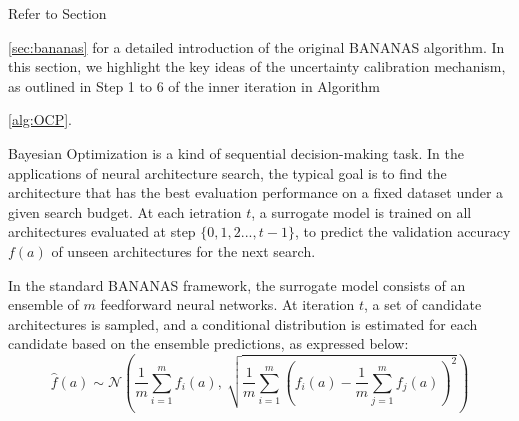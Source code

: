 \documentclass[a4paper,oneside,bibliography=totoc]{scrbook}
\begin{document}
Refer to Section {\ref{sec:bananas} for a detailed introduction of the original BANANAS algorithm. In this section, we highlight the key ideas of the uncertainty calibration mechanism, as outlined in Step 1 to 6 of the inner iteration in Algorithm {\ref{alg:OCP}.

Bayesian Optimization is a kind of sequential decision-making task. In the applications of neural architecture search, the typical goal is to find the architecture that has the best evaluation performance on a fixed dataset under a given search budget. At each ietration $t$, a surrogate model is trained on all architectures evaluated at step $\{0, 1, 2..., t-1\}$, to predict the validation accuracy $f(a)$ of unseen architectures for the next search.

In the standard BANANAS framework, the surrogate model consists of an ensemble of $m$ feedforward neural networks. At iteration $t$, a set of candidate architectures is sampled, and a conditional distribution is estimated for each candidate based on the ensemble predictions, as expressed below:
\begin{equation}
\hat{f}(a) \sim \mathcal{N} \left( 
\frac{1}{m} \sum_{i=1}^{m} f_i(a),\ 
\sqrt{\frac{1}{m} \sum_{i=1}^{m} \left(f_i(a) - \frac{1}{m} \sum_{j=1}^{m} f_j(a) \right)^2}
\right)
\label{eq:ensemble_gaussian}
\end{equation}






}}
\end{document}
